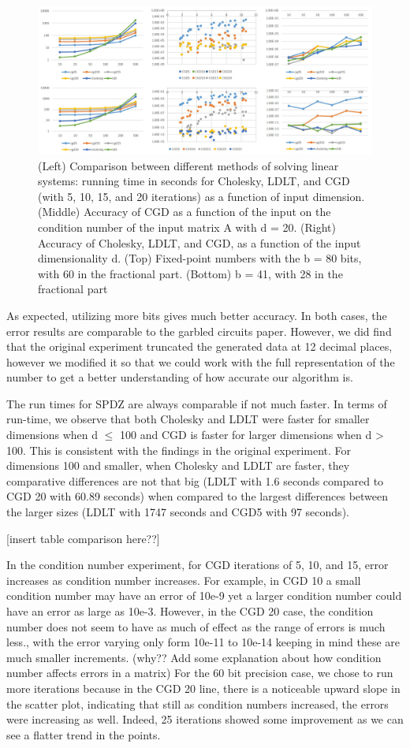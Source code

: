 \documentclass{article}
\theoremstyle{plain}
\theoremstyle{definition}
\theoremstyle{remark}
\begin{document}
\begin{figure}[h]
  \includegraphics[width=\linewidth]{results.jpg}
  \caption{(Left) Comparison between different methods of solving linear systems: running time in seconds for Cholesky, LDLT, and CGD (with 5, 10, 15, and 20 iterations) as a function of input dimension. (Middle) Accuracy of CGD as a function of the input on the condition number of the input matrix A with d = 20. (Right) Accuracy of Cholesky, LDLT, and CGD, as a function of the input dimensionality d. (Top) Fixed-point numbers with the b = 80 bits, with 60 in the fractional part. (Bottom) b = 41, with 28 in the fractional part}
  \label{fig:result1}
\end{figure}

As expected, utilizing more bits gives much better accuracy. In both cases, the error results are comparable to the garbled circuits paper. However, we did find that the original experiment truncated the generated data at 12 decimal places, however we modified it so that we could work with the full representation of the number to get a better understanding of how accurate our algorithm is.  

The run times for SPDZ are always comparable if not much faster. In terms of run-time, we observe that both Cholesky and LDLT were faster for smaller dimensions when d $\leq$ 100 and CGD is faster for larger dimensions when d > 100. This is consistent with the findings in the original experiment. For dimensions 100 and smaller, when Cholesky and LDLT are faster, they comparative differences are not that big (LDLT with 1.6 seconds compared to CGD 20 with 60.89 seconds) when compared to the largest differences between the larger sizes (LDLT with 1747 seconds and CGD5 with 97 seconds).

[insert table comparison here??]

In the condition number experiment, for CGD iterations of 5, 10, and 15, error increases as condition number increases. For example, in CGD 10 a small condition number may have an error of 10e-9 yet a larger condition number could have an error as large as 10e-3. However, in the CGD 20 case, the condition number does not seem to have as much of effect as the range of errors is much less., with the error varying only form 10e-11 to 10e-14 keeping in mind these are much smaller increments. (why?? Add some explanation about how condition number affects errors in a matrix) For the 60 bit precision case, we chose to run more iterations because in the CGD 20 line, there is a noticeable upward slope in the scatter plot, indicating that still as condition numbers increased, the errors were increasing as well. Indeed, 25 iterations showed some improvement as we can see a flatter trend in the points. 
\end{document}
